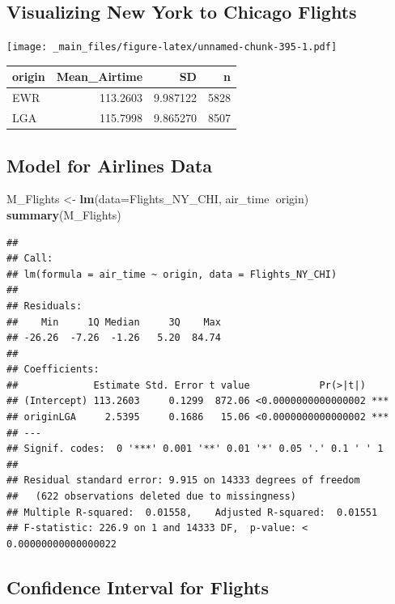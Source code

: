 \documentclass[]{book}
\newenvironment{Shaded}{\begin{snugshade}}{\end{snugshade}}
\newcommand{\KeywordTok}[1]{\textcolor[rgb]{0.13,0.29,0.53}{\textbf{#1}}}
\newcommand{\DataTypeTok}[1]{\textcolor[rgb]{0.13,0.29,0.53}{#1}}
\newcommand{\StringTok}[1]{\textcolor[rgb]{0.31,0.60,0.02}{#1}}
\newcommand{\OperatorTok}[1]{\textcolor[rgb]{0.81,0.36,0.00}{\textbf{#1}}}
\newcommand{\NormalTok}[1]{#1}
\begin{document}
\subsection{Visualizing New York to Chicago
Flights}\label{visualizing-new-york-to-chicago-flights}

\texttt{[image: \_main\_files/figure-latex/unnamed-chunk-395-1.pdf]}

\begin{tabular}{l|r|r|r}
\hline
origin & Mean\_Airtime & SD & n\\
\hline
EWR & 113.2603 & 9.987122 & 5828\\
\hline
LGA & 115.7998 & 9.865270 & 8507\\
\hline
\end{tabular}

\subsection{Model for Airlines Data}\label{model-for-airlines-data}

\begin{Shaded}
\begin{Highlighting}[]
\NormalTok{M_Flights <-}\StringTok{ }\KeywordTok{lm}\NormalTok{(}\DataTypeTok{data=}\NormalTok{Flights_NY_CHI, air_time}\OperatorTok{~}\NormalTok{origin)}
\KeywordTok{summary}\NormalTok{(M_Flights)}
\end{Highlighting}
\end{Shaded}

\begin{verbatim}
## 
## Call:
## lm(formula = air_time ~ origin, data = Flights_NY_CHI)
## 
## Residuals:
##    Min     1Q Median     3Q    Max 
## -26.26  -7.26  -1.26   5.20  84.74 
## 
## Coefficients:
##             Estimate Std. Error t value            Pr(>|t|)    
## (Intercept) 113.2603     0.1299  872.06 <0.0000000000000002 ***
## originLGA     2.5395     0.1686   15.06 <0.0000000000000002 ***
## ---
## Signif. codes:  0 '***' 0.001 '**' 0.01 '*' 0.05 '.' 0.1 ' ' 1
## 
## Residual standard error: 9.915 on 14333 degrees of freedom
##   (622 observations deleted due to missingness)
## Multiple R-squared:  0.01558,    Adjusted R-squared:  0.01551 
## F-statistic: 226.9 on 1 and 14333 DF,  p-value: < 0.00000000000000022
\end{verbatim}

\subsection{Confidence Interval for
Flights}\label{confidence-interval-for-flights}
\end{document}
